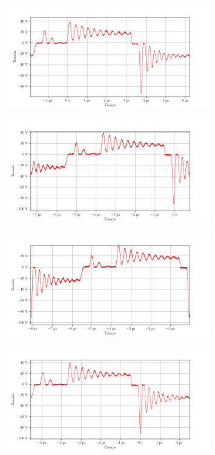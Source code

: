 \begin{figure}[ht]
    \centering
    \includegraphics[width=0.8\textwidth]{images/capturas-osciloscopio/17-11-2022/41.png}
    \caption{}
    \label{fig:osc:41}
\end{figure}

\begin{figure}[ht]
    \centering
    \includegraphics[width=0.8\textwidth]{images/capturas-osciloscopio/17-11-2022/42.png}
    \caption{}
    \label{fig:osc:42}
\end{figure}

\begin{figure}[ht]
    \centering
    \includegraphics[width=0.8\textwidth]{images/capturas-osciloscopio/17-11-2022/43.png}
    \caption{}
    \label{fig:osc:43}
\end{figure}

\begin{figure}[ht]
    \centering
    \includegraphics[width=0.8\textwidth]{images/capturas-osciloscopio/17-11-2022/44.png}
    \caption{}
    \label{fig:osc:44}
\end{figure}

